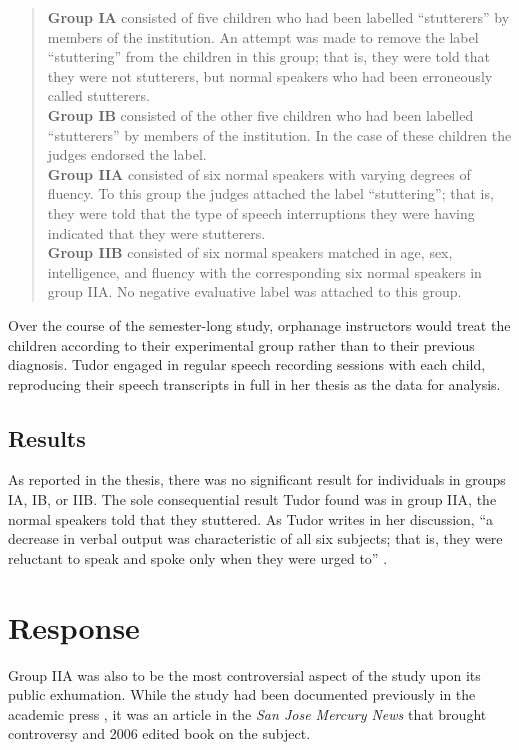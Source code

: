 \documentclass[american]{../../../coursework}
\begin{document}
\begin{quote}
\textbf{Group IA} consisted of five children who had been labelled
``stutterers'' by members of the institution. An attempt was made to
remove the label ``stuttering'' from the children in this group; that
is, they were told that they were not stutterers, but normal speakers
who had been erroneously called stutterers.\\
\textbf{Group IB} consisted of the other five children who had been
labelled ``stutterers'' by members of the institution. In the case of
these children the judges endorsed the label.\\
\textbf{Group IIA} consisted of six normal speakers with varying degrees
of fluency. To this group the judges attached the label ``stuttering'';
that is, they were told that the type of speech interruptions they were
having indicated that they were stutterers.\\
\textbf{Group IIB} consisted of six normal speakers matched in age, sex,
intelligence, and fluency with the corresponding six normal speakers in
group IIA. No negative evaluative label was attached to this group.

\parencite[4]{Tud39}
\end{quote}

Over the course of the semester-long study, orphanage instructors would
treat the children according to their experimental group rather than to
their previous diagnosis. Tudor engaged in regular speech recording
sessions with each child, reproducing their speech transcripts in full
in her thesis as the data for analysis.

\subsection{Results}

As reported in the thesis, there was no significant result for
individuals in groups IA, IB, or IIB. The sole consequential result
Tudor found was in group IIA, the normal speakers told that they
stuttered. As Tudor writes in her discussion, ``a decrease in verbal
output was characteristic of all six subjects; that is, they were
reluctant to speak and spoke only when they were urged to'' \parencite[147]{Tud39}.

\section{Response}

Group IIA was also to be the most controversial aspect of the study upon
its public exhumation. While the study had been documented previously in
the academic press \parencite[see][]{Sil88}, it was an article in the
\emph{San Jose Mercury News} that brought controversy and 2006 edited
book on the subject.
\end{document}
